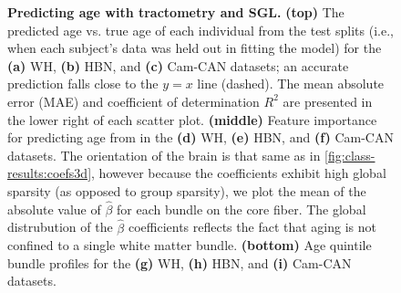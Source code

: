 \documentclass[10pt,letterpaper]{article}
\begin{document}
\begin{figure}[t!]
    {\label{fig:age-results:wh-scatter}}
    {\label{fig:age-results:hbn-scatter}}
    {\label{fig:age-results:cc-scatter}}
    {\label{fig:age-results:wh-coefs3d}}
    {\label{fig:age-results:hbn-coefs3d}}
    {\label{fig:age-results:cc-coefs3d}}
    {\label{fig:age-results:wh-profile}}
    {\label{fig:age-results:hbn-profile}}
    {\label{fig:age-results:cc-profile}}
    \caption{%
        {\bf Predicting age with tractometry and SGL.}
        \label{fig:age-results}
        {\bf (top)} The predicted age vs. true age of each individual from the test
        splits (i.e., when each subject's data was held out in fitting the
        model) for the {\bf (a)} WH, {\bf (b)} HBN, and {\bf (c)} Cam-CAN
        datasets; an accurate prediction falls close to the $y=x$ line
        (dashed). The mean absolute error (MAE) and coefficient of
        determination $R^2$ are presented in the lower right of each scatter
        plot.
        {\bf (middle)} Feature importance for predicting age from
         in
        the {\bf (d)} WH, {\bf (e)} HBN, and {\bf (f)} Cam-CAN datasets.
        The orientation of the
        brain is that same as in \cref{fig:class-results:coefs3d}, however because
        the coefficients exhibit high global sparsity (as opposed to group
        sparsity), we plot the mean of the absolute value of $\hat{\beta}$
        for each bundle on the core fiber. The global distrubution of the
        $\hat{\beta}$ coefficients reflects the fact that aging is not
        confined to a single white matter bundle.
        {\bf (bottom)} Age quintile bundle profiles for the {\bf (g)} WH,
        {\bf (h)} HBN, and {\bf (i)} Cam-CAN datasets.
    }
\end{figure}
\end{document}
